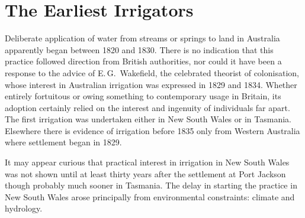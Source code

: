 
\setcounter{endnote}{0}

\chapter{The Earliest Irrigators}

Deliberate application of water from streams or springs to land in
Australia apparently began between 1820 and 1830.  There is no
indication that this practice followed direction from British
authorities, nor could it have been a response to the advice of
E.\,G.~Wakefield, the celebrated theorist of colonisation, whose
interest in Australian irrigation was expressed in 1829 and 1834.
Whether entirely fortuitous or owing something to contemporary usage
in Britain, its adoption certainly relied on the interest and
ingenuity of individuals far apart.  The first irrigation was
undertaken either in New South Wales or in Tasmania.  Elsewhere there
is evidence of irrigation before 1835 only from Western Australia
where settlement began in 1829.

It may appear curious that practical interest in irrigation in New
South Wales was not shown until at least thirty years after the
settlement at Port Jackson though probably much sooner in Tasmania.
The delay in starting the practice in New South Wales arose
principally from environmental constraints: climate and hydrology.

